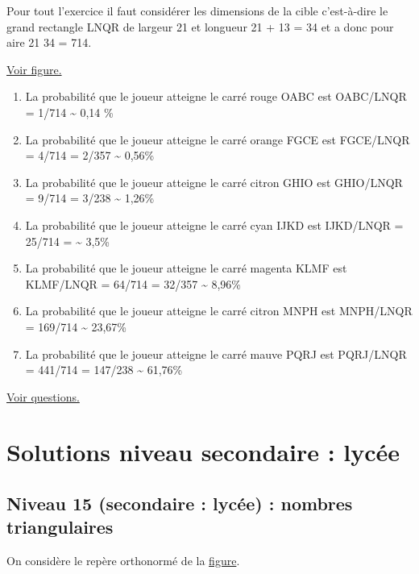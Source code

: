 \documentclass[11pt]{article}
\begin{document}
Pour tout l'exercice il faut considérer les dimensions de la cible
c'est-à-dire le grand rectangle LNQR de largeur 21 et longueur 21 +
13 = 34 et a donc pour aire 21\texttimes{} 34 = 714.

\hyperref[orgfb1884a]{Voir figure.}

\begin{enumerate}
\item La probabilité que le joueur atteigne le carré rouge OABC est 
OABC/LNQR = 1/714 \textasciitilde{} 0,14 \%
\item La probabilité que le joueur atteigne le carré orange FGCE est 
FGCE/LNQR = 4/714 = 2/357 \textasciitilde{} 0,56\%
\item La probabilité que le joueur atteigne le carré citron GHIO est 
GHIO/LNQR = 9/714 = 3/238 \textasciitilde{} 1,26\%
\item La probabilité que le joueur atteigne le carré cyan IJKD est 
IJKD/LNQR = 25/714 = \textasciitilde{} 3,5\%
\item La probabilité que le joueur atteigne le carré
magenta KLMF est KLMF/LNQR = 64/714 = 32/357 \textasciitilde{} 8,96\%
\item La probabilité que le joueur atteigne le carré citron MNPH est 
MNPH/LNQR = 169/714 \textasciitilde{} 23,67\%
\item La probabilité que le joueur atteigne le carré
mauve PQRJ est PQRJ/LNQR = 441/714 = 147/238 \textasciitilde{} 61,76\%
\end{enumerate}


\hyperref[org7670983]{Voir questions.}



\newpage


\section{Solutions niveau secondaire : lycée}
\label{sec:org43fe163}


\newpage


\subsection{Niveau 15 (secondaire : lycée) : nombres triangulaires}
\label{sec:org648cff2}

\label{orgff0a054}

On considère le repère orthonormé de la \hyperref[org31feee4]{figure}. 
\end{document}
